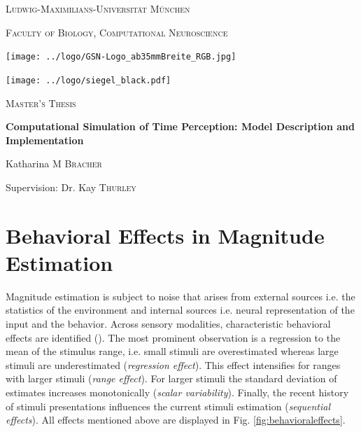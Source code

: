 \documentclass[10pt]{article}
\begin{document}
\begin{titlepage}
	\centering
	{\scshape\LARGE Ludwig-Maximilians-Universität München \par}
	{\scshape\large Faculty of Biology, Computational Neuroscience \par}
	\vspace{0.5cm}
	\texttt{[image: ../logo/GSN-Logo\_ab35mmBreite\_RGB.jpg]}\par
	\texttt{[image: ../logo/siegel\_black.pdf]}\par
	\vspace{0.7cm}
	{\scshape\LARGE Master's Thesis \par}
	\vspace{0.05cm}
	\vspace{0.05cm}
	{\huge\bfseries Computational Simulation of Time Perception: Model Description and Implementation \par}
	\vspace{1.5cm}
	{\Large Katharina \textsc{M Bracher} \par}
	\vspace{0.4cm}
	{\large Supervision: Dr. Kay \textsc{Thurley} \par}
\end{titlepage}


\normalsize
\tableofcontents
\pagebreak


\section{Behavioral Effects in Magnitude Estimation}
Magnitude estimation is subject to noise that arises from external sources i.e. the statistics of the environment and internal sources i.e. neural representation of the input and the behavior.
Across sensory modalities, characteristic behavioral effects are identified (\cite{Petzschner2015}).
The most prominent observation is a regression to the mean of the stimulus range,  i.e. small stimuli are overestimated whereas large stimuli are underestimated (\textit{regression effect}). 
This effect intensifies for ranges with larger stimuli (\textit{range effect}).
For larger stimuli the standard deviation of estimates increases monotonically (\textit{scalar variability}). 
Finally, the recent history of stimuli presentations influences the current stimuli estimation (\textit{sequential effects}).
All effects mentioned above are displayed in Fig. \ref{fig:behavioraleffects}. 
\end{document}
